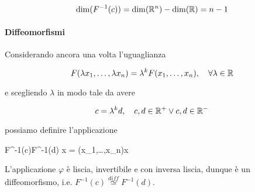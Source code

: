 {\begin{equation}
	\dim(F^{-1}(c)) = \dim(\mathbb{R}^{n}) - \dim(\mathbb{R}) = n - 1
\end{equation}

\paragraph{Diffeomorfismi}

Considerando ancora una volta l'uguaglianza

\begin{equation}
	F(\lambda x_{1},\dots,\lambda x_{n}) = \lambda^{k} F(x_{1},\dots,x_{n}) %
	\qcomma \forall \lambda \in \R
\end{equation}

e scegliendo $ \lambda $ in modo tale da avere

\begin{equation}
	c = \lambda^{k} d \qcomma c,d \in \R^{+} \lor c,d \in \R^{-}
\end{equation}

possiamo definire l'applicazione

\map{\varphi}
	{F^{-1}(c)}{F^{-1}(d)}
	{x = (x_{1},\dots,x_{n})}{\lambda x}

L'applicazione $ \varphi $ è liscia, invertibile e con inversa liscia, dunque è un diffeomorfismo, i.e. $ F^{-1}(c) \stackrel{diff}{\simeq} F^{-1}(d) $.
}


